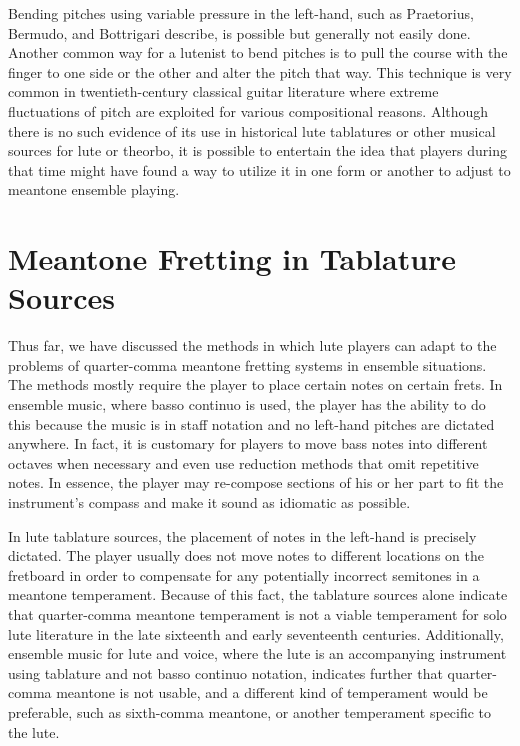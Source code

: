 Bending pitches using variable pressure in the left-hand, such as Praetorius,
Bermudo, and Bottrigari describe, is possible but generally not easily done.
Another common way for a lutenist to bend pitches is to pull the course with the
finger to one side or the other and alter the pitch that way. This technique is
very common in twentieth-century classical guitar literature where extreme
fluctuations of pitch are exploited for various compositional reasons. Although
there is no such evidence of its use in historical lute tablatures or other
musical sources for lute or theorbo, it is possible to entertain the idea that
players during that time might have found a way to utilize it in one form or
another to adjust to meantone ensemble playing.

\section{Meantone Fretting in Tablature Sources}

Thus far, we have discussed the methods in which lute players can adapt to the problems
of quarter-comma meantone fretting systems in ensemble situations.  The methods mostly
require the player to place certain notes on certain frets.  In ensemble music, where
basso continuo is used, the player has the ability to do this because the music is in
staff notation and no left-hand pitches are dictated anywhere.  In fact, it is
customary for players to move bass notes into different octaves when necessary and even
use reduction methods that omit repetitive notes.  In essence, the player may
re-compose sections of his or her part to fit the instrument's compass and make it
sound as idiomatic as possible.

In lute tablature sources, the placement of notes in the left-hand is precisely
dictated. The player usually does not move notes to different locations on the
fretboard in order to compensate for any potentially incorrect semitones in a
meantone temperament.  Because of this fact, the tablature sources alone
indicate that quarter-comma meantone temperament is not a viable temperament for
solo lute literature in the late sixteenth and early seventeenth centuries.
Additionally, ensemble music for lute and voice, where the lute is an
accompanying instrument using tablature and not basso continuo notation,
indicates further that quarter-comma meantone is not usable, and a different
kind of temperament would be preferable, such as sixth-comma meantone, or
another temperament specific to the lute.

